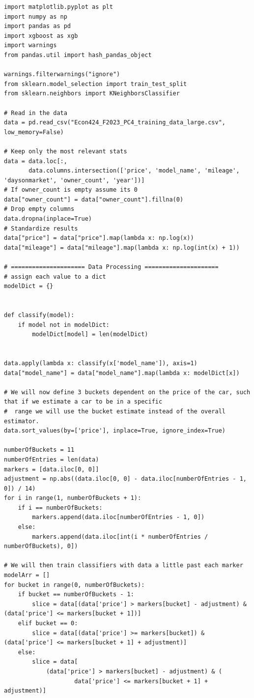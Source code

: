 \documentclass{article}
\begin{document}
\begin{lstlisting}
import matplotlib.pyplot as plt
import numpy as np
import pandas as pd
import xgboost as xgb
import warnings
from pandas.util import hash_pandas_object

warnings.filterwarnings("ignore")
from sklearn.model_selection import train_test_split
from sklearn.neighbors import KNeighborsClassifier

# Read in the data
data = pd.read_csv("Econ424_F2023_PC4_training_data_large.csv", low_memory=False)

# Keep only the most relevant stats
data = data.loc[:,
       data.columns.intersection(['price', 'model_name', 'mileage', 'daysonmarket', 'owner_count', 'year'])]
# If owner_count is empty assume its 0
data["owner_count"] = data["owner_count"].fillna(0)
# Drop empty columns
data.dropna(inplace=True)
# Standardize results
data["price"] = data["price"].map(lambda x: np.log(x))
data["mileage"] = data["mileage"].map(lambda x: np.log(int(x) + 1))

# ===================== Data Processing =====================
# assign each value to a dict
modelDict = {}


def classify(model):
    if model not in modelDict:
        modelDict[model] = len(modelDict)


data.apply(lambda x: classify(x['model_name']), axis=1)
data["model_name"] = data["model_name"].map(lambda x: modelDict[x])

# We will now define 3 buckets dependent on the price of the car, such that if we estimate a car to be in a specific
#  range we will use the bucket estimate instead of the overall estimator.
data.sort_values(by=['price'], inplace=True, ignore_index=True)

numberOfBuckets = 11
numberOfEntries = len(data)
markers = [data.iloc[0, 0]]
adjustment = np.abs((data.iloc[0, 0] - data.iloc[numberOfEntries - 1, 0]) / 14)
for i in range(1, numberOfBuckets + 1):
    if i == numberOfBuckets:
        markers.append(data.iloc[numberOfEntries - 1, 0])
    else:
        markers.append(data.iloc[int(i * numberOfEntries / numberOfBuckets), 0])

# We will then train classifiers with data a little past each marker
modelArr = []
for bucket in range(0, numberOfBuckets):
    if bucket == numberOfBuckets - 1:
        slice = data[(data['price'] > markers[bucket] - adjustment) & (data['price'] <= markers[bucket + 1])]
    elif bucket == 0:
        slice = data[(data['price'] >= markers[bucket]) & (data['price'] <= markers[bucket + 1] + adjustment)]
    else:
        slice = data[
            (data['price'] > markers[bucket] - adjustment) & (
                    data['price'] <= markers[bucket + 1] + adjustment)]


\end{lstlisting}
\end{document}
